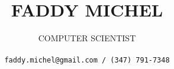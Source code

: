 \title{
\uppercase{Faddy Michel}
}

\author{
\uppercase{Computer Scientist}\\ \\
\texttt{faddy.michel@gmail.com / (347) 791-7348}
}

\date{}

\maketitle
